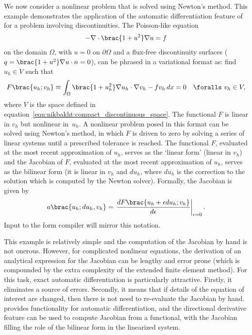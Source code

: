 We now consider a nonlinear problem that is solved using Newton's
method.  This example demonstrates the application of the automatic
differentiation feature of \ufl{} for a problem involving discontinuities.
The Poisson-like equation
%
\begin{equation}
  -\nabla \cdot \brac{1 + u^{2}} \nabla u = f
\end{equation}
%
on the domain $\Omega$, with $u = 0$ on $\partial \Omega$ and a flux-free
discontinuity surfaces ($q = \brac{1 + u^{2}} \nabla u \cdot \vect{n}
= 0$), can be phrased in a variational format as: find $u_{h} \in V$
such that
%
\begin{equation}
  F\brac{u_{h}; v_{h}}
    \equiv \int_{\Omega} \brac{1 + u_{h}^{2}} \nabla u_{h} \cdot \nabla v_{h}
      - f v_{h}  \dif x
    = 0 \quad \foralls \ v_{h} \in V,
\label{eqn:nikbakht:nonlinear_poisson}
\end{equation}
%
where $V$ is the space defined in
equation~\eqref{eqn:nikbakht:compact_discontinuous_space}.
The functional
$F$ is linear in $v_{h}$ but nonlinear in~$u_{h}$.  A nonlinear problem
posed in this format can be solved using Newton's method, in which $F$ is
driven to zero by solving a series of linear systems until a prescribed
tolerance is reached. The functional $F$, evaluated at the most recent
approximation of $u_{h}$, serves as the `linear form' (linear in $v_{h}$)
and the Jacobian of $F$, evaluated at the most recent approximation
of $u_{h}$, serves as the bilinear form (it is linear in $v_{h}$ and
$du_{h}$, where $du_{h}$ is the correction to the solution which is
computed by the Newton solver). Formally, the Jacobian is given by
%
\begin{equation}
  a\brac{u_{h}; du_{h}, v_{h}} = \left. \frac{dF\brac{u_{h}
      + \epsilon du_{h}; v_{h}}}{d \epsilon} \right|_{\epsilon=0}.
\label{eqn:nikbakht:nonlinear_poisson_J}
\end{equation}
%
Input to the form compiler will mirror this notation.

This example is relatively simple and the computation of the Jacobian
by hand is not onerous. However, for complicated nonlinear equations,
the derivation of an analytical expression for the Jacobian can be
lengthy and error prone (which is compounded by the extra complexity of
the extended finite element method).  For this task, exact automatic
differentiation is particularly attractive. Firstly, it eliminates a
source of errors.  Secondly, it means that if details of the equation of
interest are changed, then there is not need to re-evaluate the Jacobian
by hand. \ufl{} provides functionality for automatic differentiation,
and the directional derivative feature can be used to compute Jacobian
from a functional, with the Jacobian filling the role of the bilinear
form in the linearized system.

